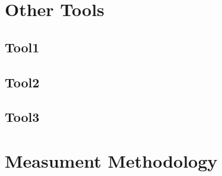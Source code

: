 \section{Other Tools} \label{sec3:other_tools}

\subsection{Tool1} \label{}
\subsection{Tool2} \label{}
\subsection{Tool3} \label{}

\section{Measument Methodology} \label{sec3:measurement_methodology}

